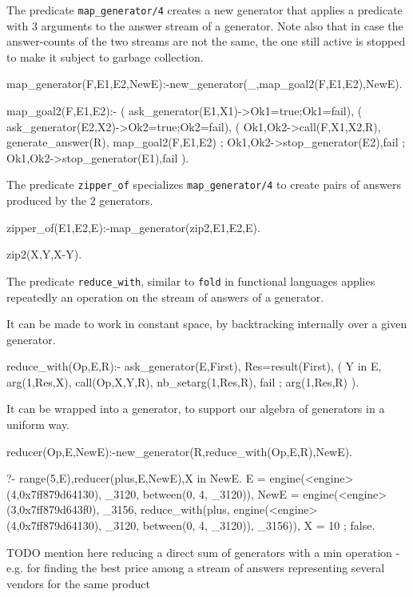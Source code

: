 \documentclass{new_tlp}
\begin{document}
The predicate {\tt map\_generator/4} creates a new generator that
applies a predicate with 3 arguments to the answer stream  of a generator.
Note also that in case the answer-counts of the two streams are not the same, the one
still active is stopped to make it subject to garbage collection.
\begin{code}
map_generator(F,E1,E2,NewE):-new_generator(_,map_goal2(F,E1,E2),NewE).

map_goal2(F,E1,E2):-
  ( ask_generator(E1,X1)->Ok1=true;Ok1=fail),
  ( ask_generator(E2,X2)->Ok2=true;Ok2=fail),
  ( Ok1,Ok2->call(F,X1,X2,R),
    generate_answer(R),
    map_goal2(F,E1,E2)
  ; \+Ok1,Ok2->stop_generator(E2),fail
  ; Ok1,\+Ok2->stop_generator(E1),fail
  ).
\end{code}

The predicate {\tt zipper\_of} specializes {\tt map\_generator/4} to create
pairs of answers produced by the 2 generators.
\begin{code}
zipper_of(E1,E2,E):-map_generator(zip2,E1,E2,E).

zip2(X,Y,X-Y).
\end{code}
The predicate {\tt reduce\_with}, similar to {\tt fold} in functional languages
applies repeatedly an operation on the stream of answers of a generator.

It can be made to work in constant space, by
backtracking internally over a given generator.
\begin{code}
reduce_with(Op,E,R):-
  ask_generator(E,First),
  Res=result(First),
  ( Y in E,
    arg(1,Res,X),
    call(Op,X,Y,R),
    nb_setarg(1,Res,R),
    fail
  ; arg(1,Res,R)
  ).
\end{code}

It can be wrapped into a generator, to support our algebra of generators in a uniform way.

\begin{code}
reducer(Op,E,NewE):-new_generator(R,reduce_with(Op,E,R),NewE).
\end{code}

\BX
\begin{codex}
?- range(5,E),reducer(plus,E,NewE),X in NewE.
E = engine(<engine>(4,0x7ff879d64130), _3120, between(0, 4, _3120)),
NewE = engine(<engine>(3,0x7ff879d643f0), _3156, reduce_with(plus,
engine(<engine>(4,0x7ff879d64130), _3120, between(0, 4, _3120)), _3156)),
X = 10 ;
false.
\end{codex}
\EX
\BI
\I TODO mention here reducing a direct sum of generators with a min operation - e.g. for finding the best price among a stream of answers representing several vendors for the same product
\EI
\end{document}
